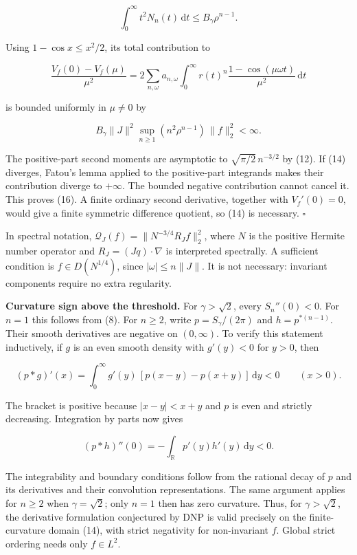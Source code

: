 \documentclass[
  british,
  11pt,
  a4paper,
]{article}
\begin{document}
\[
\int_0^\infty t^2N_n(t)\,\mathrm dt\le B_\gamma\rho^{n-1}.
\]

Using \(1-\cos x\le x^2/2\), its total contribution to

\[
\frac{V_f(0)-V_f(\mu)}{\mu^2}
=2\sum_{n,\omega}a_{n,\omega}
\int_0^\infty r(t)^n\frac{1-\cos(\mu\omega t)}{\mu^2}\,\mathrm dt
\]

is bounded uniformly in \(\mu\ne0\) by

\[
B_\gamma\|J\|^2
\sup_{n\ge1}(n^2\rho^{n-1})\,\|f\|_2^2<\infty.
\]

The positive-part second moments are asymptotic to
\(\sqrt{\pi/2}\,n^{-3/2}\) by (12). If (14) diverges, Fatou's lemma
applied to the positive-part integrands makes their contribution diverge
to \(+\infty\). The bounded negative contribution cannot cancel it. This
proves (16). A finite ordinary second derivative, together with
\(V_f'(0)=0\), would give a finite symmetric difference quotient, so
(14) is necessary. \(\square\)

In spectral notation, \(\mathcal Q_J(f)=\|N^{-3/4}R_Jf\|_2^2\), where
\(N\) is the positive Hermite number operator and
\(R_J=(Jq)\cdot\nabla\) is interpreted spectrally. A sufficient
condition is \(f\in D(N^{1/4})\), since \(|\omega|\le n\|J\|\). It is
not necessary: invariant components require no extra regularity.

\textbf{Curvature sign above the threshold.} For \(\gamma>\sqrt2\),
every \(S_n''(0)<0\). For \(n=1\) this follows from (8). For \(n\ge2\),
write \(p=S_\gamma/(2\pi)\) and \(h=p^{*(n-1)}\). Their smooth
derivatives are negative on \((0,\infty)\). To verify this statement
inductively, if \(g\) is an even smooth density with \(g'(y)<0\) for
\(y>0\), then

\[
(p*g)'(x)=\int_0^\infty g'(y)\,[p(x-y)-p(x+y)]\,\mathrm dy<0
\qquad(x>0).
\]

The bracket is positive because \(|x-y|<x+y\) and \(p\) is even and
strictly decreasing. Integration by parts now gives

\[
(p*h)''(0)=-\int_{\mathbb R}p'(y)h'(y)\,\mathrm dy<0.
\]

The integrability and boundary conditions follow from the rational decay
of \(p\) and its derivatives and their convolution representations. The
same argument applies for \(n\ge2\) when \(\gamma=\sqrt2\); only \(n=1\)
then has zero curvature. Thus, for \(\gamma>\sqrt2\), the derivative
formulation conjectured by DNP is valid precisely on the
finite-curvature domain (14), with strict negativity for non-invariant
\(f\). Global strict ordering needs only \(f\in L^2\).
\end{document}
